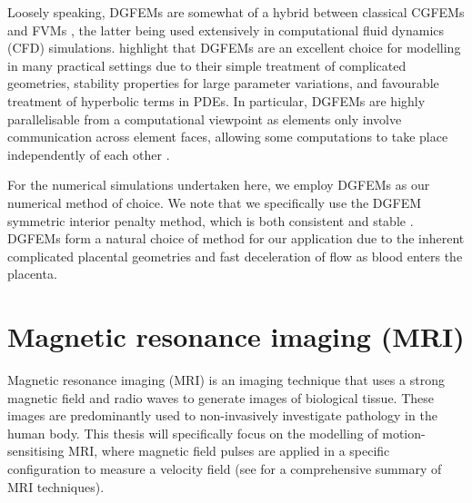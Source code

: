         Loosely speaking, DGFEMs are somewhat of a hybrid between classical CGFEMs and FVMs \cite{cangianiHpVersionDiscontinuousGalerkin2017}, the latter being used extensively in computational fluid dynamics (CFD) simulations. \citeauthor{cangianiHpVersionDiscontinuousGalerkin2017} \cite{cangianiHpVersionDiscontinuousGalerkin2017} highlight that DGFEMs are an excellent choice for modelling in many practical settings due to their simple treatment of complicated geometries, stability properties for large parameter variations, and favourable treatment of hyperbolic terms in PDEs. In particular, DGFEMs are highly parallelisable from a computational viewpoint as elements only involve communication across element faces, allowing some computations to take place independently of each other \cite{flahertySoftwareParallelAdaptive2000}.

        For the numerical simulations undertaken here, we employ DGFEMs as our numerical method of choice. We note that we specifically use the DGFEM symmetric interior penalty method, which is both consistent and stable \cite{arnoldUnifiedAnalysisDiscontinuous2006}. DGFEMs form a natural choice of method for our application due to the inherent complicated placental geometries and fast deceleration of flow as blood enters the placenta.

    \section{Magnetic resonance imaging (MRI)}

        Magnetic resonance imaging (MRI) is an imaging technique that uses a strong magnetic field and radio waves to generate images of biological tissue. These images are predominantly used to non-invasively investigate pathology in the human body. This thesis will specifically focus on the modelling of motion-sensitising MRI, where magnetic field pulses are applied in a specific configuration to measure a velocity field (see \cite{bernsteinHandbookMRIPulse2004} for a comprehensive summary of MRI techniques).

